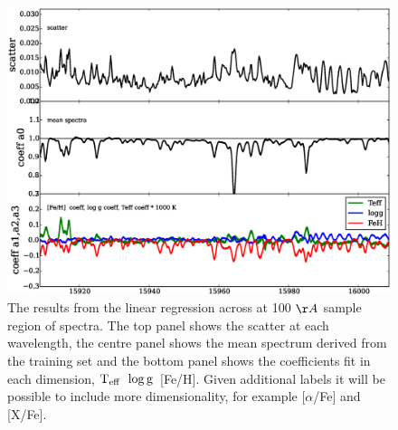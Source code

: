 \documentclass[12pt, preprint]{aastex}
\newcommand{\teff}{\mbox{$\rm T_{eff}$}}
\newcommand{\logg}{\mbox{$\rm \log g$}}
\begin{document}
\begin{figure}[h!]
  \includegraphics[width=\hsize]{./plots/R1_example.eps}
\caption{The results from the linear regression across at 100 $\AA$ sample region of spectra. The top panel shows the scatter at each wavelength, the centre panel shows the mean spectrum derived from the training set and the bottom panel shows the coefficients fit in each dimension, \teff\, \logg\, [Fe/H]. Given additional labels it will be possible to include more dimensionality, for example [$\alpha$/Fe] and [X/Fe].}
\label{fig:fits}
\end{figure}
\end{document}
